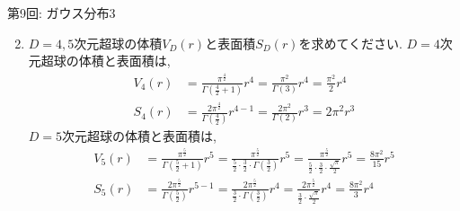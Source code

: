 \documentclass[dvipdfmx,notheorems,t]{beamer}
\begin{document}
\begin{frame}{第9回: ガウス分布3}
\begin{enumerate}
  \setcounter{enumi}{1}
  \item $D = 4, 5$次元超球の体積$V_D(r)$と表面積$S_D(r)$を求めてください.
  $D = 4$次元超球の体積と表面積は,
  \begin{align*}
    V_4(r) &= \frac{\pi^\frac{4}{2}}{\Gamma(\frac{4}{2} + 1)} r^4
      = \frac{\pi^2}{\Gamma(3)} r^4 = \frac{\pi^2}{2} r^4 \\
    S_4(r) &= \frac{2\pi^\frac{4}{2}}{\Gamma(\frac{4}{2})} r^{4 - 1}
      = \frac{2\pi^2}{\Gamma(2)} r^3 = 2\pi^2 r^3
  \end{align*}
  $D = 5$次元超球の体積と表面積は,
  \begin{align*}
    V_5(r) &= \frac{\pi^\frac{5}{2}}{\Gamma(\frac{5}{2} + 1)} r^5
      = \frac{\pi^\frac{5}{2}}{\frac{5}{2} \cdot \frac{3}{2} \cdot \Gamma(\frac{3}{2})} r^5
      = \frac{\pi^\frac{5}{2}}{\frac{5}{2} \cdot \frac{3}{2} \cdot \frac{\sqrt{\pi}}{2}} r^5
      = \frac{8\pi^2}{15} r^5 \\
    S_5(r) &= \frac{2\pi^\frac{5}{2}}{\Gamma(\frac{5}{2})} r^{5 - 1}
      = \frac{2\pi^\frac{5}{2}}{\frac{3}{2} \cdot \Gamma(\frac{3}{2})} r^4
      = \frac{2\pi^\frac{5}{2}}{\frac{3}{2} \cdot \frac{\sqrt{\pi}}{2}} r^4
      = \frac{8\pi^2}{3} r^4
  \end{align*}
\end{enumerate}
\end{frame}
\end{document}

